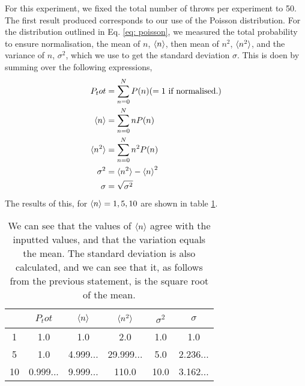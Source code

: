 \documentclass{article}
\theoremstyle{definition}
\theoremstyle{remark}
\begin{document}
For this experiment, we fixed the total number of throws per experiment to 50.\\
The first result produced corresponds to our use of the Poisson distribution. For the distribution outlined in Eq. \ref{eq: poisson}, we measured the total probability to ensure normalisation, the mean of $n$, $\braket{n}$, then mean of $n^2$, $\braket{n^2}$, and the variance of $n$, $\sigma^2$, which we use to get the standard deviation $\sigma$. This is doen by summing over the following expressions,
\begin{align*}
    P_tot &= \sum_{n=0}^{N} P(n) (=1 \text{ if normalised.})\\
    \braket{n} &= \sum_{n=0}^{N} nP(n)\\
    \braket{n^2} &= \sum_{n=0}^{N} n^2P(n)\\
    \sigma^2 &= \braket{n^2} - \braket{n}^2\\
    \sigma &= \sqrt{\sigma^2}
\end{align*}
The results of this, for $\braket{n} = 1, 5, 10$ are shown in table \ref{tab: poisson values}.\\ 
\begin{table}[H]
    
    \centering
    \begin{tabular}{c|c|c|c|c|c}
        \hline
        ~ & $P_tot$ & $\braket{n}$ & $\braket{n^2}$ & $\sigma^2$ & $\sigma$\\
        \hline
        1 & 1.0 & 1.0 & 2.0 & 1.0 & 1.0\\
        5 & 1.0 & 4.999... & 29.999... & 5.0 & 2.236...\\
        10 & 0.999... & 9.999... & 110.0 & 10.0 & 3.162...\\
        \hline
    \end{tabular}
    \caption{\label{tab: poisson values} We can see that the values of $\braket{n}$ agree with the inputted values, and that the variation equals the mean. The standard deviation is also calculated, and we can see that it, as follows from the previous statement, is the square root of the mean.}
\end{table}
\end{document}
